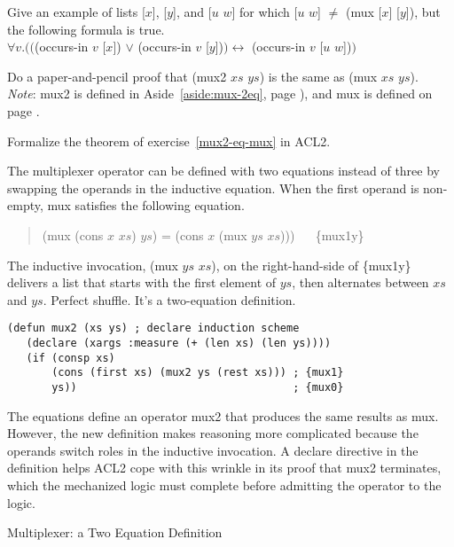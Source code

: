 \begin{ExerciseList}
\Exercise\label{mux-val-len-not-enough}
Give an example of lists \textsf{[$x$]}, \textsf{[$y$]}, and \textsf{[$u$ $w$]} for which
\textsf{[$u$ $w$]} $\neq$ \textsf{(mux [$x$] [$y$])}, but the following formula is true.\\
\hspace*{1cm}$\forall v.(($\textsf{(occurs-in $v$ [$x$])} $\vee$ \textsf{(occurs-in $v$ [$y$])}$)
\leftrightarrow$ \textsf{(occurs-in $v$ [$u$ $w$])}$)$

\Exercise\label{mux2-eq-mux}
Do a paper-and-pencil proof that
\textsf{(mux2 $xs$ $ys$)} is the same as \textsf{(mux $xs$ $ys$)}.\\
\emph{Note}: \textsf{mux2} is defined in
Aside~\ref{aside:mux-2eq}, page \pageref{aside:mux-2eq}),
and \textsf{mux} is defined on page \pageref{mux-defun}.

\Exercise
Formalize the theorem of exercise~\ref{mux2-eq-mux} in ACL2.

\end{ExerciseList}

\begin{aside}
The multiplexer operator can be defined with two equations instead of three
by swapping the operands in the inductive equation.
When the first operand is non-empty, \textsf{mux} satisfies the following equation.
\begin{quote}
\textsf{(mux (cons $x$ $xs$) $ys$) = (cons $x$ (mux $ys$ $xs$)))} ~~ \{mux1y\}
\end{quote}

The inductive invocation, \textsf{(mux $ys$ $xs$)},
on the right-hand-side of \{mux1y\}
delivers a list that starts with the first element of $ys$,
then alternates between $xs$ and $ys$.
Perfect shuffle.
It's a two-equation definition.

\label{mux-2eq-defun}\begin{Verbatim}
(defun mux2 (xs ys) ; declare induction scheme
   (declare (xargs :measure (+ (len xs) (len ys))))
   (if (consp xs)
       (cons (first xs) (mux2 ys (rest xs))) ; {mux1}
       ys))                                  ; {mux0}
\end{Verbatim}

The equations define an operator \textsf{mux2} that produces
the same results as \textsf{mux}.
However, the new definition makes reasoning more complicated
because the operands switch roles in the inductive invocation.
A \textsf{declare} directive in the definition
helps ACL2 cope with this wrinkle in its
proof that \textsf{mux2} terminates,
which the mechanized logic must complete before
admitting the operator to the logic.
\caption{Multiplexer: a Two Equation Definition}
\label{aside:mux-2eq}
\end{aside}


